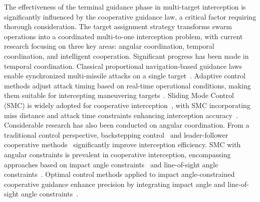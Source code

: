 \documentclass[lettersize,journal]{IEEEtran}
\begin{document}
The effectiveness of the terminal guidance phase in multi-target interception is significantly
influenced by the cooperative guidance law, a critical factor requiring thorough consideration.
The target assignment strategy transforms swarm operations into a coordinated multi-to-one
interception problem, with current research focusing on three key areas: angular coordination,
temporal coordination, and intelligent cooperation.
Significant progress has been made in temporal coordination.
Classical proportional navigation-based guidance laws enable synchronized multi-missile attacks
on a single target~\cite{tao2024analytical}.
Adaptive control methods adjust attack timing based on real-time operational conditions, making
them suitable for intercepting maneuvering targets~\cite{wang2025generalized,zhang2022multiple}.
Sliding Mode Control (SMC) is widely adopted for cooperative
interception~\cite{sinha2020supertwisting}, with SMC incorporating miss distance and attack
time constraints enhancing interception
accuracy~\cite{shen2025three,jin2025cooperative,hu2019sliding}.
Considerable research has also been conducted on angular coordination.
From a traditional control perspective, backstepping control~\cite{li2024adaptive} and
leader-follower cooperative methods~\cite{he2017impact} significantly improve interception
efficiency.
SMC with angular constraints is prevalent in cooperative interception, encompassing approaches
based on impact angle constraints~\cite{wang2025hybrid} and line-of-sight angle
constraints~\cite{li2024near}.
Optimal control methods applied to impact angle-constrained cooperative guidance enhance
precision by integrating impact angle and line-of-sight angle
constraints~\cite{wang2025adaptive,tao2023optimal}.
\end{document}
